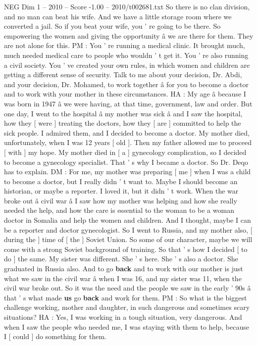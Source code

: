 \begin{textsample}{NEG Dim 1 – 2010 – Score -1.00 – 2010/t002681.txt}
So there is no clan division, and no man can beat his wife.
And we have a little storage room where we converted a jail.
So if you beat your wife, you ' re going to be there.
So empowering the women and giving the opportunity â we are there for them.
They are not alone for this.
PM : You ' re running a medical clinic.
It brought much, much needed medical care to people who wouldn ' t get it.
You ' re also running a civil society.
You ' ve created your own rules, in which women and children are getting a different sense of security.
Talk to me about your decision, Dr.
Abdi, and your decision, Dr.
Mohamed, to work together â for you to become a doctor and to work with your mother in these circumstances.
HA : My age â because I was born in 1947 â we were having, at that time, government, law and order.
But one day, I went to the hospital â my mother was sick â and I saw the hospital, how they [ were ] treating the doctors, how they [ are ] committed to help the sick people.
I admired them, and I decided to become a doctor.
My mother died, unfortunately, when I was 12 years [ old ].
Then my father allowed me to proceed [ with ] my hope.
My mother died in [ a ] gynecology complication, so I decided to become a gynecology specialist.
That ' s why I became a doctor.
So Dr.
Deqo has to explain.
DM : For me, my mother was preparing [ me ] when I was a child to become a doctor, but I really didn ' t want to.
Maybe I should become an historian, or maybe a reporter.
I loved it, but it didn ' t work.
When the war broke out â civil war â I saw how my mother was helping and how she really needed the help, and how the care is essential to the woman to be a woman doctor in Somalia and help the women and children.
And I thought, maybe I can be a reporter and doctor gynecologist.
So I went to Russia, and my mother also, [ during the ] time of [ the ] Soviet Union.
So some of our character, maybe we will come with a strong Soviet background of training.
So that ' s how I decided [ to do ] the same.
My sister was different.
She ' s here.
She ' s also a doctor.
She graduated in Russia also.
And to go \textbf{back} and to work with our mother is just what we saw in the civil war â when I was 16, and my sister was 11, when the civil war broke out.
So it was the need and the people we saw in the early ' 90s â that ' s what made \textbf{us} go \textbf{back} and work for them.
PM : So what is the biggest challenge working, mother and daughter, in such dangerous and sometimes scary situations?
HA : Yes, I was working in a tough situation, very dangerous.
And when I saw the people who needed me, I was staying with them to help, because I [ could ] do something for them.

\end{textsample}
